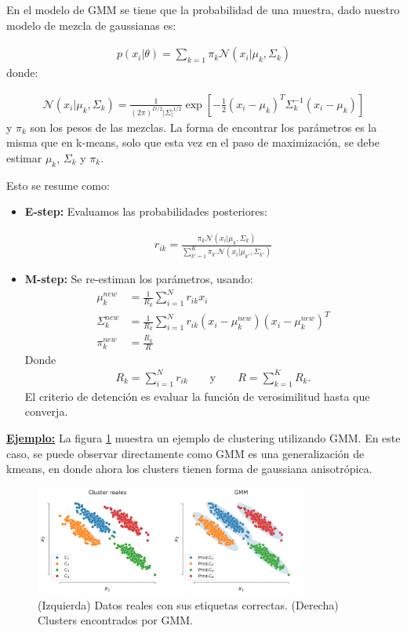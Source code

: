En el modelo de GMM se tiene que la probabilidad de una muestra, dado nuestro modelo de mezcla de gaussianas es:

\begin{align}
p(x_i|\theta) = \sum_{k=1} \pi_k \mathcal{N}(x_i| \mu_k,\Sigma_k)
\end{align}
donde:

\begin{align}
\mathcal{N}(x_i| \mu_k,\Sigma_k) = \frac{1}{(2\pi)^{D/2}|\Sigma|^{1/2}}\exp \left[ -\frac{1}{2}(x_i-\mu_k)^T \Sigma_k^{-1}(x_i-\mu_k) \right]
\end{align}
y $\pi_k$ son los pesos de las mezclas. La forma de encontrar los parámetros es la misma que en k-means, solo que esta vez en el paso de maximización, se debe estimar $\mu_k$, $\Sigma_k$ y $\pi_k$.

Esto se resume como:

\begin{itemize}
    \item \textbf{E-step:} Evaluamos las probabilidades posteriores:
    
    \begin{align}
    r_{ik} = \frac{\pi_k \mathcal{N}(x_i| \mu_k,\Sigma_k)}{\sum_{k'=1}^K \pi_{k'}\mathcal{N}(x_i| \mu_{k'},\Sigma_{k'})}
    \end{align}
    \item \textbf{M-step:} Se re-estiman los parámetros, usando:
    \begin{align}
    \mu_k^{new} & = \frac{1}{R_k}\sum_{i=1}^N r_{ik}x_i\\
    \Sigma_k^{new} & = \frac{1}{R_k} \sum_{i=1}^N r_{ik}(x_i - \mu_k^{new})(x_i - \mu_k^{new})^T\\
    \pi_k^{new} & = \frac{R_k}{R}
    \end{align}
    Donde
    \begin{align*}
    R_k = \sum_{i=1}^N r_{ik} \qquad \text{y} \qquad R = \sum_{k=1}^K R_k.
    \end{align*}
    El criterio de detención es evaluar la función de verosimilitud hasta que converja.
\end{itemize}

\underline{\textbf{Ejemplo:}} La figura \ref{fig:gmm} muestra un ejemplo de clustering utilizando GMM. En este caso, se puede observar directamente como GMM es una generalización de kmeans, en donde ahora los clusters tienen forma de gaussiana anisotrópica.

\begin{figure}[ht]
  \centering
  \includegraphics[width=0.8\textwidth]{img/cap7_gmm}
  \caption{(Izquierda) Datos reales con sus etiquetas correctas. (Derecha) Clusters encontrados por GMM.}
  \label{fig:gmm}
\end{figure}


